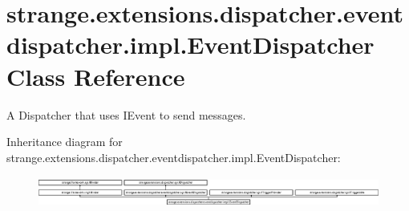 \hypertarget{classstrange_1_1extensions_1_1dispatcher_1_1eventdispatcher_1_1impl_1_1_event_dispatcher}{\section{strange.\-extensions.\-dispatcher.\-eventdispatcher.\-impl.\-Event\-Dispatcher Class Reference}
\label{classstrange_1_1extensions_1_1dispatcher_1_1eventdispatcher_1_1impl_1_1_event_dispatcher}
}


A Dispatcher that uses I\-Event to send messages.  


Inheritance diagram for strange.\-extensions.\-dispatcher.\-eventdispatcher.\-impl.\-Event\-Dispatcher\-:\begin{figure}[H]
\begin{center}
\leavevmode
\includegraphics[height=1.037037cm]{classstrange_1_1extensions_1_1dispatcher_1_1eventdispatcher_1_1impl_1_1_event_dispatcher}
\end{center}
\end{figure}
